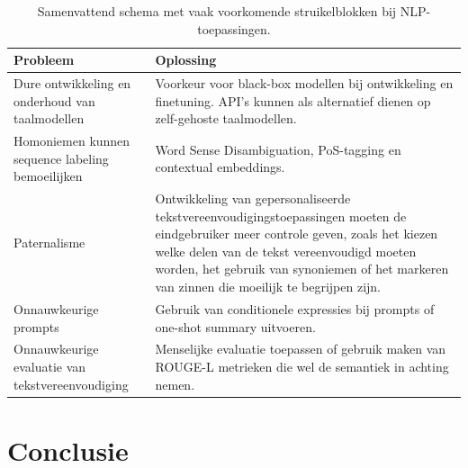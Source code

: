 \begin{center}
	\begin{table}[H]
	\begin{tabular}{ m{4cm} | m{10cm} | }
		\hline
		\textbf{Probleem} & \textbf{Oplossing} \\
		\hline
		Dure ontwikkeling en onderhoud van taalmodellen & Voorkeur voor black-box modellen bij ontwikkeling en finetuning. API's kunnen als alternatief dienen op zelf-gehoste taalmodellen. \\
		\hline
		Homoniemen kunnen sequence labeling bemoeilijken & Word Sense Disambiguation, PoS-tagging en contextual embeddings. \\
		\hline
		Paternalisme & Ontwikkeling van gepersonaliseerde tekstvereenvoudigingstoepassingen moeten de eindgebruiker meer controle geven, zoals het kiezen welke delen van de tekst vereenvoudigd moeten worden, het gebruik van synoniemen of het markeren van zinnen die moeilijk te begrijpen zijn. \\
		\hline
		Onnauwkeurige prompts & Gebruik van conditionele expressies bij prompts of one-shot summary uitvoeren. \\
		\hline
		Onnauwkeurige evaluatie van tekstvereenvoudiging & Menselijke evaluatie toepassen of gebruik maken van ROUGE-L metrieken die wel de semantiek in achting nemen. 
		\hline
	\end{tabular}
	\caption{Samenvattend schema met vaak voorkomende struikelblokken bij NLP-toepassingen.}
	\label{table:summary-hurdles}
	\end{table}
\end{center}

\section{Conclusie}

